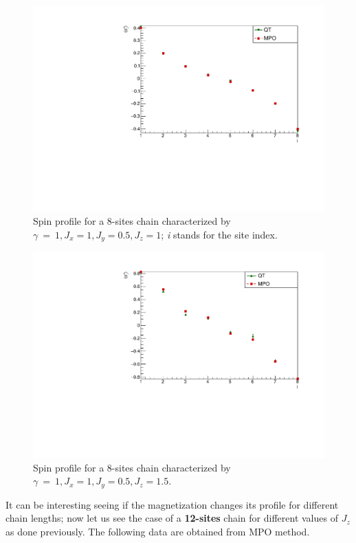 \begin{figure}[H]
    \centering
    \includegraphics[scale=0.7]{Figures/8sites/LMComparison_8sJ1051.pdf}
    \caption{Spin profile for a 8-sites chain characterized by $\gamma~=~1, J_x=1, J_y=0.5, J_z=1$; \emph{i} stands for the site index.}
    \label{fig:8sites_LMcomparisonJz1}
\end{figure}

\begin{figure}[H]
    \centering
    \includegraphics[scale=0.7]{Figures/8sites/LMComparison_8sJ10515.pdf}
    \caption{Spin profile for a 8-sites chain characterized by $\gamma~=~1, J_x=1, J_y=0.5, J_z=1.5$.}
    \label{fig:LMComparison_8sJ10515}
\end{figure}

It can be interesting seeing if the magnetization changes its profile for different chain lengths; now let us see the case of a \textbf{12-sites} chain for different values of $J_z$ as done previously. The following data are obtained from MPO method.

